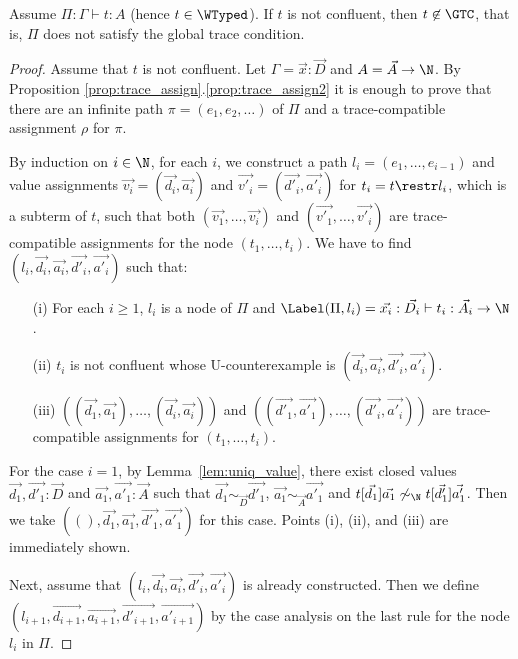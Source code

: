 \begin{theorem}
  Assume $\Pi:\Gamma\vdash t:A$ (hence $t \in \WTyped$). 
  If $t$ is not confluent,
  then $t \not\in \GTC$, that is, $\Pi$ does not satisfy the global trace condition. 
\end{theorem}
\begin{proof}
  Assume that $t$ is not confluent. 
  Let $\Gamma = \vec{x}:\vec{D}$ and $A = \vec{A}\rightarrow\N$. 
  By Proposition \ref{prop:trace_assign}.\ref{prop:trace_assign2} it is enough to prove that
  there are an infinite path $\pi=(e_1, e_2, \ldots)$ of $\Pi$
  and a trace-compatible assignment $\rho$ for $\pi$.
  
  By induction on $i \in \N$, for each $i$, we construct a path $l_i = (e_1,\ldots,e_{i-1})$
  and value assignments $\vec{v_i} = (\vec{d_i},\vec{a_i})$ and $\vec{v'_i} = (\vec{d'_i},\vec{a'_i})$
  for $t_i = t \restr l_i$, which is a subterm of $t$, such that 
  both $(\vec{v_1},\ldots,\vec{v_i})$ and $(\vec{v'_1},\ldots,\vec{v'_i})$ are
  trace-compatible assignments for the node $(t_1, \ldots, t_i)$.
  We have to find $(l_i,\vec{d_i},\vec{a_i},\vec{d'_i},\vec{a'_i})$ such that:
  \begin{enumerate}
  \item[(i)]
    For each $i\ge 1$, $l_i$ is a node of $\Pi$ and
    $\Label(\Pi,l_i) = \vec{x_i}:\vec{D_i}\vdash t_i:\vec{A_i}\rightarrow\N$. 
  \item[(ii)]
    $t_i$ is not confluent whose U-counterexample is $(\vec{d_i},\vec{a_i},\vec{d'_i},\vec{a'_i})$. 
  \item[(iii)]
    $((\vec{d_1},\vec{a_1}),\ldots,(\vec{d_i},\vec{a_i}))$ and
    $((\vec{d'_1},\vec{a'_1}),\ldots,(\vec{d'_i},\vec{a'_i}))$ are trace-compatible assignments for
    $(t_1,\ldots,t_i)$. 
  \end{enumerate}

  For the case $i=1$,
  by Lemma~\ref{lem:uniq_value},
  there exist closed values $\vec{d_1},\vec{d'_1}:\vec{D}$ and $\vec{a_1},\vec{a'_1}:\vec{A}$ such that
  $\vec{d_1}\sim_{\vec{D}}\vec{d'_1}$, $\vec{a_1}\sim_{\vec{A}}\vec{a'_1}$ and 
  $t[\vec{d_1}]\vec{a_1} \not\sim_{\N} t[\vec{d'_1}]\vec{a'_1}$. 
  Then we take $((),\vec{d_1},\vec{a_1},\vec{d'_1},\vec{a'_1})$ for this case.
  Points (i), (ii), and (iii) are immediately shown. 

  Next, assume that $(l_i,\vec{d_i},\vec{a_i},\vec{d'_i},\vec{a'_i})$ is already constructed. 
  Then we define $(l_{i+1},\vec{d_{i+1}},\vec{a_{i+1}},\vec{d'_{i+1}},\vec{a'_{i+1}})$ by the case analysis
  on the last rule for the node $l_i$ in $\Pi$. 


\end{proof}
